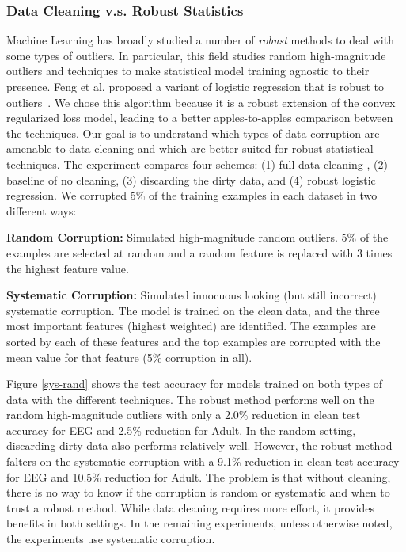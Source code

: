\subsubsection{Data Cleaning v.s. Robust Statistics}
Machine Learning has broadly studied a number of \emph{robust} methods to deal with some types of outliers. In particular, this field studies random high-magnitude outliers and techniques to make statistical model training agnostic to their presence. Feng et al. proposed a variant of logistic regression that is robust to outliers~\cite{feng2014robust}. We chose this algorithm because it is a robust extension of the convex regularized loss model, leading to a better apples-to-apples comparison between the techniques.
Our goal is to understand which types of data corruption are amenable to data cleaning and which are better suited for robust statistical techniques.
The experiment compares four schemes: (1) full data cleaning  , (2) baseline of no cleaning, (3) discarding the dirty data, and (4) robust logistic regression. 
We corrupted 5\% of the training examples in each dataset in two different ways:

\vspace{0.5em}

\noindent\textbf{Random Corruption: } Simulated high-magnitude random outliers. 5\% of the examples are selected at random and a random feature is replaced with 3 times the highest feature value.

\vspace{0.5em}

\noindent\textbf{Systematic Corruption: } Simulated innocuous looking (but still incorrect) systematic corruption. The model is trained on the clean data, and the three most important features (highest weighted) are identified. The examples are sorted by each of these features and the top examples are corrupted with the mean value for that feature (5\% corruption in all). 

Figure \ref{sys-rand} shows the test accuracy for models trained on both types of data with the different techniques.
The robust method performs well on the random high-magnitude outliers with only a 2.0\% reduction in clean test accuracy for EEG and 2.5\% reduction for Adult.
In the random setting, discarding dirty data also performs relatively well.
However, the robust method falters on the systematic corruption with a 9.1\% reduction in clean test accuracy for EEG and 10.5\% reduction for Adult.
The problem is that without cleaning, there is no way to know if the corruption is random or systematic and when to trust a robust method.
While data cleaning requires more effort, it provides benefits in both settings.
In the remaining experiments, unless otherwise noted, the experiments use systematic corruption.

